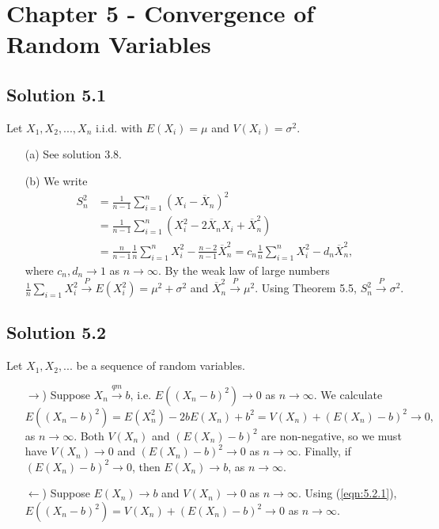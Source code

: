 \section*{Chapter 5 - Convergence of Random Variables}

\subsection*{Solution 5.1}

Let $X_1, X_2, ..., X_n$ i.i.d. with $E(X_i) = \mu$ and $V(X_i) = \sigma^2$.

\begin{itemize}
    \item[(a)] See solution 3.8.
    \item[(b)] We write
        \begin{equation*}
            \begin{split}
                S_n^2 &= \frac{1}{n - 1} \sum_{i = 1}^n (X_i - \overline{X}_n)^2 \\
                    &= \frac{1}{n - 1} \sum_{i = 1}^n (X_i^2 - 2 \overline{X}_n X_i + \overline{X}_n^2) \\
                    &= \frac{n}{n - 1} \frac{1}{n} \sum_{i = 1}^n X_i^2 - \frac{n - 2}{n - 1} \overline{X}_n^2
                    = c_n \frac{1}{n} \sum_{i = 1}^n X_i^2 - d_n \overline{X}_n^2,
            \end{split}
        \end{equation*}
        where $c_n, d_n \to 1$ as $n \to \infty$.
        By the weak law of large numbers $\frac{1}{n} \sum_{i = 1} X_i^2 \xrightarrow{P} E(X_i^2) = \mu^2 + \sigma^2$ and $\overline{X}_n^2 \xrightarrow{P} \mu^2$.
        Using Theorem 5.5, $S_n^2 \xrightarrow{P} \sigma^2$.
\end{itemize}


\subsection*{Solution 5.2}

Let $X_1, X_2, ...$ be a sequence of random variables.
\begin{itemize}
    \item[$\rightarrow$)] Suppose $X_n \xrightarrow{qm} b$, i.e. $E((X_n - b)^2) \to 0$ as $n \to \infty$.
        We calculate
        \begin{equation}
            \label{eqn:5.2.1}
            E((X_n - b)^2) = E(X_n^2) - 2bE(X_n) + b^2
                = V(X_n) + (E(X_n) - b)^2
                \to 0,
        \end{equation}
        as $n \to \infty$.
        Both $V(X_n)$ and $(E(X_n) - b)^2$ are non-negative, so we must have $V(X_n) \to 0$ and $(E(X_n) - b)^2 \to 0$ as $n \to \infty$.
        Finally, if $(E(X_n) - b)^2 \to 0$, then $E(X_n) \to b$, as $n \to \infty$.
    \item[$\leftarrow$)] Suppose $E(X_n) \to b$ and $V(X_n) \to 0$ as $n \to \infty$.
        Using (\ref{eqn:5.2.1}), $E((X_n - b)^2) = V(X_n) + (E(X_n) - b)^2 \to 0$ as $n \to \infty$.
\end{itemize}


